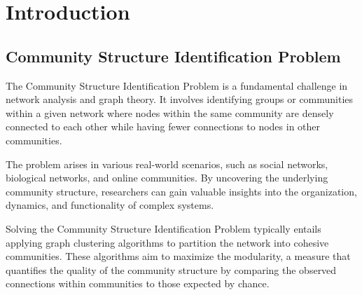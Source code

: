 \section{Introduction}
\subsection{Community Structure Identification Problem}
The Community Structure Identification Problem is a fundamental challenge in network analysis and graph theory. It involves identifying groups or communities within a given network where nodes within the same community are densely connected to each other while having fewer connections to nodes in other communities.

The problem arises in various real-world scenarios, such as social networks, biological networks, and online communities. By uncovering the underlying community structure, researchers can gain valuable insights into the organization, dynamics, and functionality of complex systems.

Solving the Community Structure Identification Problem typically entails applying graph clustering algorithms to partition the network into cohesive communities. These algorithms aim to maximize the modularity, a measure that quantifies the quality of the community structure by comparing the observed connections within communities to those expected by chance.

